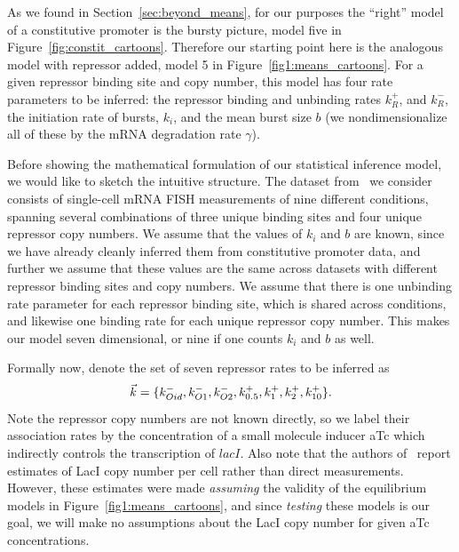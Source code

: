 As we found in Section~\ref{sec:beyond_means}, for our purposes
the ``right'' model of a constitutive promoter is the bursty
picture, model five in Figure~\ref{fig:constit_cartoons}.
Therefore our starting point here is the analogous model with
repressor added, model 5 in Figure~\ref{fig1:means_cartoons}.
For a given repressor binding site and copy number,
this model has four rate parameters to be inferred:
the repressor binding and unbinding rates $k_R^+$, and $k_R^-$,
the initiation rate of bursts, $k_i$, and the mean burst size $b$
(we nondimensionalize all of these by the mRNA degradation rate $\gamma$).

Before showing the mathematical formulation of our statistical
inference model, we would like to sketch the intuitive structure.
The dataset from~\cite{Jones2014} we consider consists of
single-cell mRNA FISH measurements of nine different conditions,
spanning several combinations of three unique binding sites and
four unique repressor copy numbers. We assume that the values of
$k_i$ and $b$ are known, since we have already cleanly inferred
them from constitutive promoter data, and further we assume that
these values are the same across datasets with different
repressor binding sites and copy numbers. We assume that there is
one unbinding rate parameter for each repressor binding site,
which is shared across conditions, and likewise one binding rate
for each unique repressor copy number. This makes our model seven
dimensional, or nine if one counts $k_i$ and $b$ as well.

Formally now, denote the set of seven repressor rates to be inferred as
\begin{equation}
\vec{k} =\{k_{Oid}^-, k_{O1}^-, k_{O2}^-,
k_{0.5}^+, k_{1}^+, k_{2}^+, k_{10}^+\}.
\end{equation}
Note the repressor copy numbers are not known directly, so we label their
association rates by the concentration of a small molecule inducer aTc
which indirectly controls the transcription of $\textit{lacI}$.
Also note that the authors of~\cite{Jones2014} report estimates
of LacI copy number per cell rather than direct measurements.
However, these estimates were made \textit{assuming} the validity
of the equilibrium models in Figure~\ref{fig1:means_cartoons},
and since \textit{testing} these models is our goal, we will make
no assumptions about the LacI copy number for given aTc concentrations.

